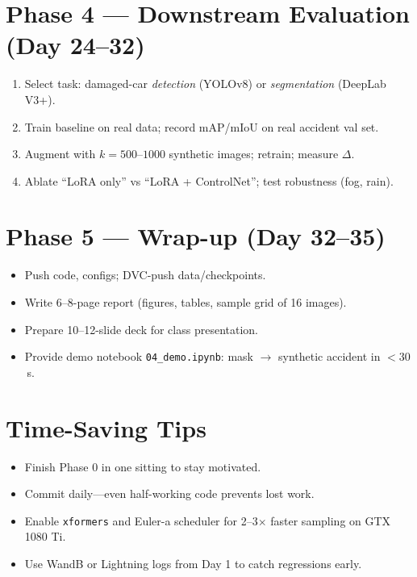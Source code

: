 \documentclass[11pt]{article}
\begin{document}
\section*{Phase 4 — Downstream Evaluation (Day 24–32)}
\begin{enumerate}[leftmargin=*, label=\arabic*.]
  \item Select task: damaged-car \textit{detection} (YOLOv8) or \textit{segmentation} (DeepLab V3+).
  \item Train baseline on real data; record mAP/mIoU on real accident val set.
  \item Augment with $k=500\text{–}1000$ synthetic images; retrain; measure $\Delta$.
  \item Ablate “LoRA only” vs “LoRA + ControlNet”; test robustness (fog, rain).
\end{enumerate}

\section*{Phase 5 — Wrap-up (Day 32–35)}
\begin{itemize}[leftmargin=*]
  \item Push code, configs; DVC‐push data/checkpoints.
  \item Write 6–8-page report (figures, tables, sample grid of 16 images).
  \item Prepare 10–12-slide deck for class presentation.
  \item Provide demo notebook \texttt{04\_demo.ipynb}: mask $\rightarrow$ synthetic accident in $<30$ s.
\end{itemize}

\section*{Time-Saving Tips}
\vspace{-4pt}
\begin{itemize}[leftmargin=*]
  \item Finish Phase 0 in one sitting to stay motivated.
  \item Commit daily—even half-working code prevents lost work.
  \item Enable \verb|xformers| and Euler-a scheduler for 2–3$\times$ faster sampling on GTX 1080 Ti.
  \item Use WandB or Lightning logs from Day 1 to catch regressions early.
\end{itemize}
\end{document}
